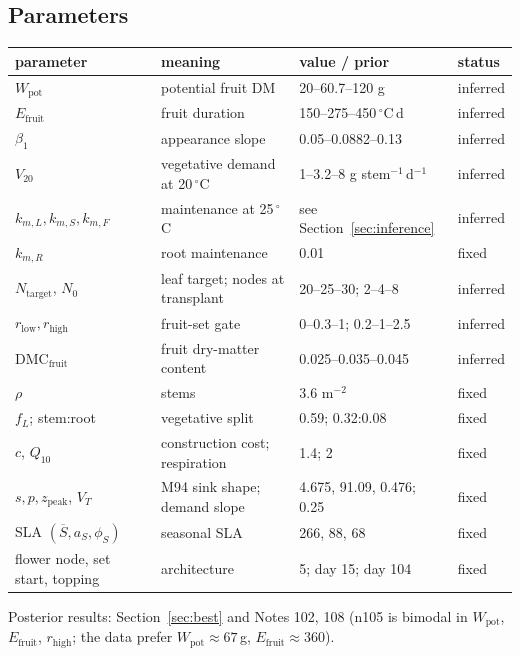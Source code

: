 \documentclass[11pt,a4paper]{article}
\begin{document}
\subsection{Parameters}
\begin{center}\small
\begin{tabular}{llll}
\toprule
parameter & meaning & value / prior & status\\
\midrule
$W_{\text{pot}}$ & potential fruit DM & 20--60.7--120 g & inferred\\
$E_{\text{fruit}}$ & fruit duration & 150--275--450\,$^\circ$C\,d & inferred\\
$\beta_1$ & appearance slope & 0.05--0.0882--0.13 & inferred\\
$V_{20}$ & vegetative demand at 20\,$^\circ$C & 1--3.2--8 g stem$^{-1}$\,d$^{-1}$ & inferred\\
$k_{m,L},k_{m,S},k_{m,F}$ & maintenance at 25\,$^\circ$C & see Section~\ref{sec:inference} & inferred\\
$k_{m,R}$ & root maintenance & 0.01 & fixed\\
$N_{\text{target}}$, $N_0$ & leaf target; nodes at transplant & 20--25--30; 2--4--8 & inferred\\
$r_{\text{low}},r_{\text{high}}$ & fruit-set gate & 0--0.3--1; 0.2--1--2.5 & inferred\\
$\mathrm{DMC}_{\text{fruit}}$ & fruit dry-matter content & 0.025--0.035--0.045 & inferred\\
$\rho$ & stems & 3.6 m$^{-2}$ & fixed\\
$f_L$; stem:root & vegetative split & 0.59; 0.32:0.08 & fixed\\
$c$, $Q_{10}$ & construction cost; respiration & 1.4; 2 & fixed\\
$s,p,z_{\text{peak}}$, $V_T$ & M94 sink shape; demand slope & 4.675, 91.09, 0.476; 0.25 & fixed\\
SLA $(\overline S,a_S,\phi_S)$ & seasonal SLA & 266, 88, 68 & fixed\\
flower node, set start, topping & architecture & 5; day 15; day 104 & fixed\\
\bottomrule
\end{tabular}
\end{center}
Posterior results: Section~\ref{sec:best} and Notes 102, 108 (n105 is bimodal in $W_{\text{pot}}$,
$E_{\text{fruit}}$, $r_{\text{high}}$; the data prefer $W_{\text{pot}}\approx67$\,g, $E_{\text{fruit}}\approx360$).

\end{document}
